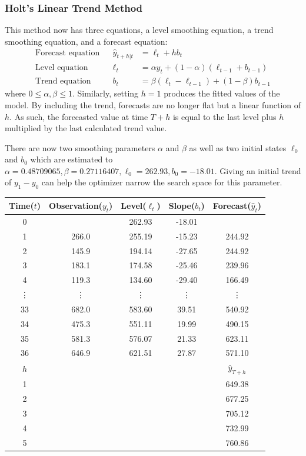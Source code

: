 \documentclass{article}
\begin{document}
  \subsubsection*{Holt's Linear Trend Method}
  This method now has three equations, a level smoothing equation, a trend smoothing equation, and a forecast equation:
  \begin{align*}
    \text{Forecast equation} && \hat{y}_{t+h|t} &= \ell_{t} + hb_{t} \\
    \text{Level equation}   && \ell_{t} &= \alpha y_{t} + (1 - \alpha)(\ell_{t-1} + b_{t-1})\\
    \text{Trend equation}   && b_{t}    &= \beta(\ell_{t} - \ell_{t-1}) + (1 -\beta)b_{t-1}
  \end{align*}
  where $0 \le \alpha, \beta \le 1$. Similarly, setting $h=1$ produces the fitted values of the model. By including the trend, forecasts are no longer flat but a linear function of $h$. As such, the forecasted value at time $T+h$ is equal to the last level plus $h$ multiplied by the last calculated trend value.

  There are now two smoothing parameters $\alpha$ and $\beta$ as well as two initial states $\ell_0$ and $b_0$ which are estimated to $\alpha=0.48709065, \beta=0.27116407, \ell_0=262.93, b_0=-18.01$. Giving an initial trend of $y_1-y_0$ can help the optimizer narrow the search space for this parameter.

  \begin{center}
    \begin{tabular}{||c c c c c||} 
     \hline
     Time($t$) & Observation($y_t$) & Level($\ell_t$) & Slope($b_t$) & Forecast($\hat{y}_t$) \\ [0.5ex] 
     \hline
     0 &       & 262.93 & -18.01 &  \\ 
     \hline
     1 & 266.0 & 255.19 & -15.23 & 244.92 \\
     \hline
     2 & 145.9 & 194.14 & -27.65 & 244.92 \\
     \hline
     3 & 183.1 & 174.58 & -25.46 & 239.96 \\
     \hline
     4 & 119.3 & 134.60 & -29.40 & 166.49 \\
     \hline
     \vdots & \vdots & \vdots & \vdots & \vdots \\
     \hline
     33 & 682.0 & 583.60 & 39.51 & 540.92 \\
     \hline
     34 & 475.3 & 551.11 & 19.99 & 490.15 \\
     \hline
     35 & 581.3 & 576.07 & 21.33 & 623.11 \\
     \hline
     36 & 646.9 & 621.51 & 27.87 & 571.10 \\
     \hline
     $h$ &  &  &  & $\hat{y}_{T+h}$ \\
     \hline
     1 &  &  &  & 649.38 \\
     \hline
     2 &  &  &  & 677.25 \\
     \hline
     3 &  &  &  & 705.12 \\
     \hline
     4 &  &  &  & 732.99 \\
     \hline
     5 &  &  &  & 760.86 \\
     \hline
    \end{tabular}
  \end{center}
\end{document}
